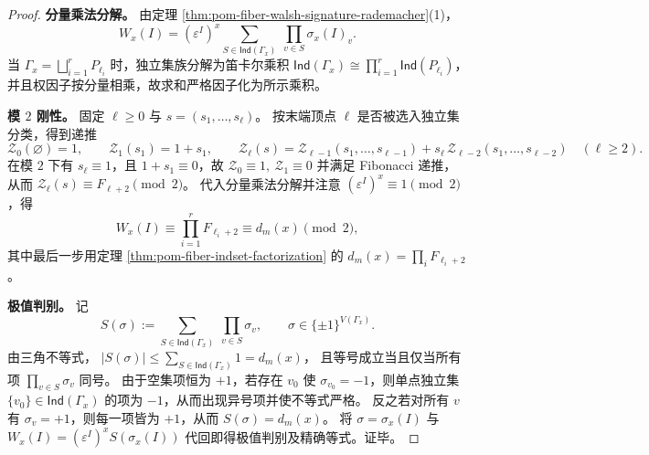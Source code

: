 \begin{proof}
\textbf{分量乘法分解。}
由定理 \ref{thm:pom-fiber-walsh-signature-rademacher}(1)，
\[
W_x(I)=(\varepsilon^I)^x\sum_{S\in\mathsf{Ind}(\Gamma_x)}\ \prod_{v\in S}\sigma_x(I)_v.
\]
当 \(\Gamma_x=\bigsqcup_{i=1}^{r}P_{\ell_i}\) 时，独立集族分解为笛卡尔乘积
\(
\mathsf{Ind}(\Gamma_x)\cong\prod_{i=1}^{r}\mathsf{Ind}(P_{\ell_i})
\)，
并且权因子按分量相乘，故求和严格因子化为所示乘积。
\par
\textbf{模 \(2\) 刚性。}
固定 \(\ell\ge 0\) 与 \(s=(s_1,\dots,s_\ell)\)。
按末端顶点 \(\ell\) 是否被选入独立集分类，得到递推
\[
\mathcal Z_0(\varnothing)=1,\qquad
\mathcal Z_1(s_1)=1+s_1,\qquad
\mathcal Z_\ell(s)=\mathcal Z_{\ell-1}(s_1,\dots,s_{\ell-1})+s_\ell\,\mathcal Z_{\ell-2}(s_1,\dots,s_{\ell-2})\quad(\ell\ge 2).
\]
在模 \(2\) 下有 \(s_\ell\equiv 1\)，且 \(1+s_1\equiv 0\)，故
\(
\mathcal Z_0\equiv 1,\ \mathcal Z_1\equiv 0
\)
并满足 Fibonacci 递推，从而 \(\mathcal Z_\ell(s)\equiv F_{\ell+2}\pmod 2\)。
代入分量乘法分解并注意 \((\varepsilon^I)^x\equiv 1\pmod 2\)，得
\[
W_x(I)\equiv \prod_{i=1}^{r}F_{\ell_i+2}\equiv d_m(x)\pmod 2,
\]
其中最后一步用定理 \ref{thm:pom-fiber-indset-factorization} 的 \(d_m(x)=\prod_i F_{\ell_i+2}\)。
\par
\textbf{极值判别。}
记
\[
S(\sigma):=\sum_{S\in\mathsf{Ind}(\Gamma_x)}\ \prod_{v\in S}\sigma_v,
\qquad \sigma\in\{\pm1\}^{V(\Gamma_x)}.
\]
由三角不等式，
\(
|S(\sigma)|\le \sum_{S\in\mathsf{Ind}(\Gamma_x)}1=d_m(x)
\)，
且等号成立当且仅当所有项 \(\prod_{v\in S}\sigma_v\) 同号。
由于空集项恒为 \(+1\)，若存在 \(v_0\) 使 \(\sigma_{v_0}=-1\)，则单点独立集 \(\{v_0\}\in\mathsf{Ind}(\Gamma_x)\) 的项为 \(-1\)，从而出现异号项并使不等式严格。
反之若对所有 \(v\) 有 \(\sigma_v=+1\)，则每一项皆为 \(+1\)，从而 \(S(\sigma)=d_m(x)\)。
将 \(\sigma=\sigma_x(I)\) 与 \(W_x(I)=(\varepsilon^I)^x S(\sigma_x(I))\) 代回即得极值判别及精确等式。证毕。
\end{proof}

\endinput
